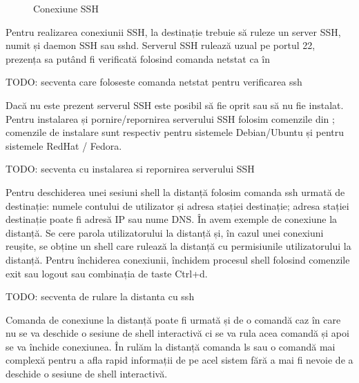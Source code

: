 \begin{figure}[htbp]
  \centering
  \def\svgwidth{\columnwidth}
  
  \caption{Conexiune SSH}
  \label{fig:sec:ssh}
\end{figure}

Pentru realizarea conexiunii SSH, la destinație trebuie să ruleze un server SSH, numit și daemon SSH sau sshd. Serverul SSH rulează uzual pe portul 22, prezența sa putând fi verificată folosind comanda netstat ca în 

\begin{screen}[caption={Serverul SSH},label={lst:sec:ssh-netstat}]
TODO: secventa care foloseste comanda netstat pentru verificarea ssh
\end{screen}

Dacă nu este prezent serverul SSH este posibil să fie oprit sau să nu fie instalat. Pentru instalarea și pornire/repornirea serverului SSH folosim comenzile din ; comenzile de instalare sunt respectiv pentru sistemele Debian/Ubuntu și pentru sistemele RedHat / Fedora.

\begin{screen}[caption={Instalare și pornire server SSH},label={lst:sec:ssh-server}]
TODO: secventa cu instalarea si repornirea serverului SSH
\end{screen}

Pentru deschiderea unei sesiuni shell la distanță folosim comanda ssh urmată de destinație: numele contului de utilizator și adresa stației destinație; adresa stației destinație poate fi adresă IP sau nume DNS. În  avem exemple de conexiune la distanță. Se cere parola utilizatorului la distanță și, în cazul unei conexiuni reușite, se obține un shell care rulează la distanță cu permisiunile utilizatorului la distanță. Pentru închiderea conexiunii, închidem procesul shell folosind comenzile exit sau logout sau combinația de taste Ctrl+d.

\begin{screen}[caption={Acces shell la distanță folosind SSH},label={lst:sec:ssh-shell}]
TODO: secventa de rulare la distanta cu ssh
\end{screen}

Comanda de conexiune la distanță poate fi urmată și de o comandă caz în care nu se va deschide o sesiune de shell interactivă ci se va rula acea comandă și apoi se va închide conexiunea. În  rulăm la distanță comanda ls sau o comandă mai complexă pentru a afla rapid informații de pe acel sistem fără a mai fi nevoie de a deschide o sesiune de shell interactivă.

